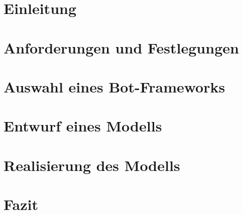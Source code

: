 \section{Einleitung}
\label{einleitung}


\clearpage
\section{Anforderungen und Festlegungen}
\label{anforderungen}


\clearpage
\section{Auswahl eines Bot-Frameworks}
\label{botframework}


\clearpage
\section{Entwurf eines Modells}


\clearpage
\section{Realisierung des Modells}



\clearpage
\section{Fazit}


\clearpage
